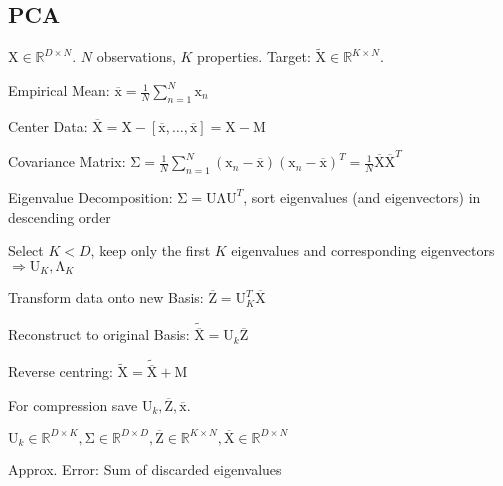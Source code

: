 \documentclass[a4paper, 11pt, landscape]{article}
\newcommand{\matr}[1]{\boldsymbol{\mathrm{#1}}}
\begin{document}
\begin{multicols*}{3}

\section{PCA}
$\matr{X} \in \mathbb{R}^{D \times N}$. $N$ observations, $K$ properties. Target: $\tilde{\matr{X}} \in \mathbb{R}^{K \times N}$.
\begin{compactenum}
	\item Empirical Mean: $\overline{\matr{x}} = \frac{1}{N} \sum_{n=1}^N \matr{x}_n$
	\item Center Data: $\overline{\matr{X}} = \matr{X} - [\overline{\matr{x}}, \ldots, \overline{\matr{x}}] = \matr{X} - \matr{M}$
	\item Covariance Matrix: $\matr{\Sigma} = \frac{1}{N	} \sum_{n=1}^N (\matr{x}_n - \overline{\matr{x}}) (\matr{x}_n - \overline{\matr{x}})^T = \frac{1}{N} \overline{\matr{X}}\overline{\matr{X}}^T$
	\item Eigenvalue Decomposition: $\matr{\Sigma} = \matr{U \Lambda U}^T$, sort eigenvalues (and eigenvectors) in descending order
	\item Select $K < D$, keep only the first $K$ eigenvalues and corresponding eigenvectors $\Rightarrow \matr{U}_K, \matr{\Lambda}_K$
	\item Transform data onto new Basis: $\overline{\matr{Z}} = \matr{U}_K^T \overline{\matr{X}}$
	\item Reconstruct to original Basis: $\tilde{\overline{\matr{X}}} = \matr{U}_k \overline{\matr{Z}}$
	\item Reverse centring: $\tilde{\matr{X}} = \tilde{\overline{\matr{X}}} + \matr{M}$
\end{compactenum}

\begin{compactitem}
	\item For compression save $\matr{U}_k, \overline{\matr{Z}}, \overline{\matr{x}}$.
	\item $\matr{U}_k \in \mathbb{R}^{D \times K}, \matr{\Sigma} \in \mathbb{R}^{D \times D}, \overline{\matr{Z}} \in \mathbb{R}^{K \times N}, \overline{\matr{X}} \in \mathbb{R}^{D \times N}$
\end{compactitem}

\begin{compactdesc}
	\item[Approx. Error:] Sum of discarded eigenvalues
\end{compactdesc}


\end{multicols*}
\end{document}
